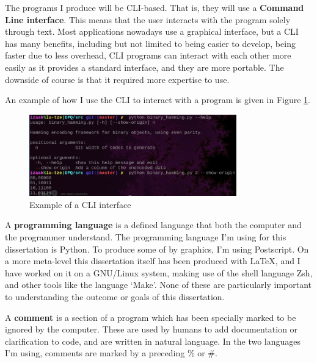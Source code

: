 \documentclass[a4paper,11pt]{article}
\begin{document}
    \begin{definition}
    The programs I produce will be CLI-based. That is, they will use a
    \textbf{Command Line interface}. This means that the user interacts with the
    program solely through text. Most applications nowadays use a graphical
    interface, but a CLI has many benefits, including but not limited to being
    easier to develop, being faster due to less overhead, CLI programs can
    interact with each other more easily as it provides a standard interface,
    and they are more portable. The downside of course is that it required more
    expertise to use.

    An example of how I use the CLI to interact with a program is given in
    Figure \ref{fig:cliusage}.
    \end{definition}

\begin{figure}[H]
\begin{center}
\includegraphics[width=0.8\textwidth]{../images/cli_usage.png}
\end{center}
\caption{Example of a CLI interface}\label{fig:cliusage}
\end{figure}

    \begin{definition}
    A \textbf{programming language} is a defined language that both the computer
    and the programmer understand.  The programming language I'm using for this
    dissertation is Python. To produce some of by graphics, I'm using
    Postscript. On a more meta-level this dissertation itself has been produced
    with \LaTeX, and I have worked on it on a GNU/Linux system, making use of
    the shell language Zsh, and other tools like the language `Make'. None of
    these are particularly important to understanding the outcome or goals of
    this dissertation.
    \end{definition}

    \begin{definition}
    A \textbf{comment} is a section of a program which has been specially marked
    to be ignored by the computer. These are used by humans to add documentation
    or clarification to code, and are written in natural language.  In the two
    languages I'm using, comments are marked by a preceding \% or \#.
    \end{definition}
\end{document}
